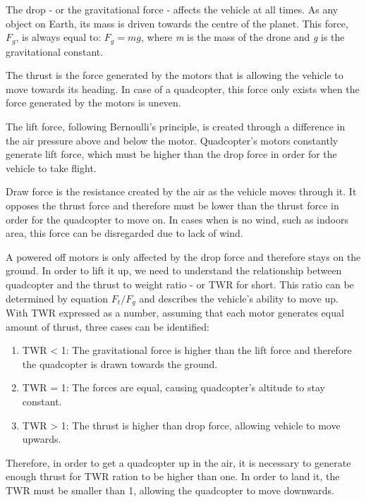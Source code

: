 The drop - or the gravitational force - affects the vehicle at all times. As any object on Earth, its mass is driven towards the centre of the planet. This force, \textit{$F_g$}, is always equal to: $F_g = mg$, where \textit{m} is the mass of the drone and \textit{g} is the gravitational constant.

The thrust is the force generated by the motors that is allowing the vehicle to move towards its heading. In case of a quadcopter, this force only exists when the force generated by the motors is uneven.

The lift force, following Bernoulli's principle, is created through a difference in the air pressure above and below the motor. Quadcopter's motors constantly generate lift force, which must be higher than the drop force in order for the vehicle to take flight.

Draw force is the resistance created by the air as the vehicle moves through it. It opposes the thrust force and therefore must be lower than the thrust force in order for the quadcopter to move on. In cases when is no wind, such as indoors area, this force can be disregarded due to lack of wind.

A powered off motors is only affected by the drop force and therefore stays on the ground. In order to lift it up, we need to understand the relationship between quadcopter and the thrust to weight ratio - or TWR for short. This ratio can be determined by equation $F_t/F_g$ and describes the vehicle's ability to move up. With TWR expressed as a number, assuming that each motor generates equal amount of thrust, three cases can be identified:
\begin{enumerate}
\item TWR < 1: The gravitational force is higher than the lift force and therefore the quadcopter is drawn towards the ground.
\item TWR = 1: The forces are equal, causing quadcopter's altitude to stay constant.
\item TWR > 1: The thrust is higher than drop force, allowing vehicle to move upwards.
\end{enumerate}

Therefore, in order to get a quadcopter up in the air, it is necessary to generate enough thrust for TWR ration to be higher than one. In order to land it, the TWR must be smaller than 1, allowing the quadcopter to move downwards.

